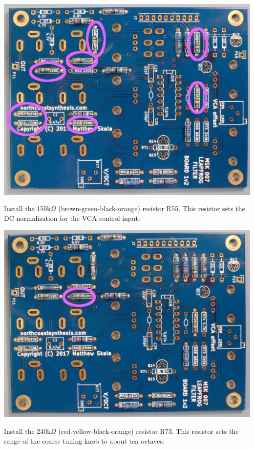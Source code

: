 \nopagebreak
\noindent\includegraphics[width=\linewidth]{res-100k1.jpg}

\pagebreak

Install the 150k$\Omega$ (brown-green-black-orange) resistor R55.
This resistor sets the DC normalization for the VCA control input.

\nopagebreak
\noindent\includegraphics[width=\linewidth]{res-150k1.jpg}

Install the 240k$\Omega$ (red-yellow-black-orange) resistor R73.
This resistor sets the range of the coarse tuning knob to about ten
octaves.

